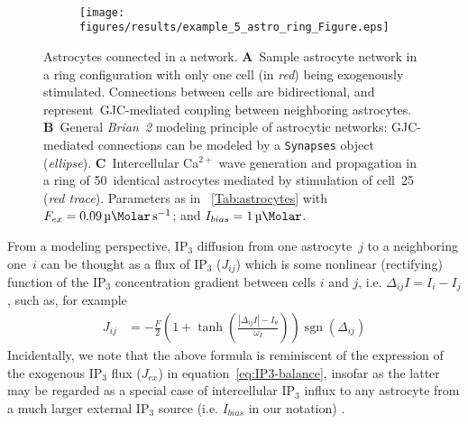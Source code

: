 \documentclass[a4paper, 11pt]{article}
\newcommand{\brian}{\emph{Brian~2}\xspace}
\DeclareMathOperator{\sgn}{sgn}
\newcommand*{\tabref}[1]{\tablename~\ref{#1}}
\renewcommand*{\eqref}[1]{equation~\ref{#1}}
\begin{document}
\begin{figure}
\begin{subfigure}[t]{0.48\textwidth}
\end{subfigure}\\[2ex]
\begin{subfigure}[t]{\textwidth}
\caption{}
\centering
\texttt{[image: figures/results/example\_5\_astro\_ring\_Figure.eps]}
\end{subfigure}
\caption{Astrocytes connected in a network.
\textbf{A}~Sample astrocyte network in a ring configuration with only one cell (in \textit{red}) being exogenously stimulated.
Connections between cells are bidirectional, and represent~GJC-mediated coupling between neighboring astrocytes.
\textbf{B}~General \brian modeling principle of astrocytic networks: GJC-mediated connections can be modeled by a \lstinline|Synapses| object (\textit{ellipse}).
\textbf{C}~Intercellular Ca$^{2+}$ wave generation and propagation in a ring of 50~identical astrocytes mediated by stimulation of cell~25 (\textit{red trace}).
Parameters as in \tabref{Tab:astrocytes} with $F_{ex}=\SI{0.09}{\micro \Molar.s^{-1}}$; and $I_{bias}=\SI{1}{\micro \Molar}$.}
\label{Fig:astro_network}
\end{figure}
From a modeling perspective, IP$_3$ diffusion from one astrocyte~$j$ to a neighboring one~$i$ can be thought as a flux of IP$_3$ ($J_{ij}$) which is some nonlinear (rectifying) function of the IP$_3$ concentration gradient between cells $i$ and $j$, i.e. $\Delta_{ij}I = I_i - I_j$, such as, for example \citep[see also \textcolor{red}{Chapter~7}]{Lallouette_FCN2014}
\begin{align}
J_{ij} &= -\frac{F}{2}\left(1+\tanh\left(\frac{|\Delta_{ij} I|-I_{\theta}}{\omega_{I}}\right)\right)\sgn(\Delta_{ij})
\end{align}
Incidentally, we note that the above formula is reminiscent of the expression of the exogenous IP$_3$ flux ($J_{ex}$) in \eqref{eq:IP3-balance}, insofar as the latter may be regarded as a special case of intercellular IP$_3$ influx to any astrocyte from a much larger external IP$_3$ source (i.e. $I_{bias}$ in our notation) \citep{Goldberg_etal_PCB2010}.
\end{document}
